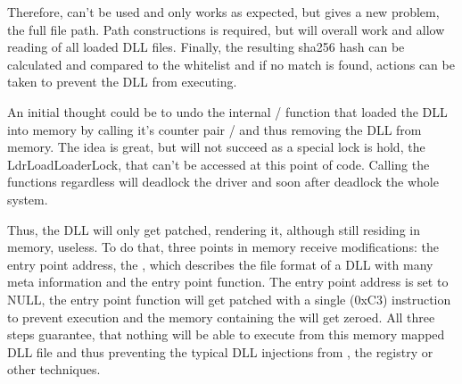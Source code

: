Therefore,  can't be used and only  works as expected, but gives a new problem, the full file path. Path constructions is required, but will overall work and allow reading of all loaded DLL files. Finally, the resulting sha256 hash can be calculated and compared to the whitelist and if no match is found, actions can be taken to prevent the DLL from executing. 

An initial thought could be to undo the internal  /  function that loaded the DLL into memory by calling it's counter pair  /  and thus removing the DLL from memory. The idea is great, but will not succeed as a special lock is hold, the LdrLoadLoaderLock, that can't be accessed at this point of code. Calling the functions regardless will deadlock the driver and soon after deadlock the whole system.

Thus, the DLL will only get patched, rendering it, although still residing in memory, useless. To do that, three points in memory receive modifications: the entry point address, the , which describes the file format of a DLL with many meta information and the entry point function. The entry point address is set to NULL, the entry point function will get patched with a single  (0xC3) instruction to prevent execution and the memory containing the  will get zeroed. All three steps guarantee, that nothing will be able to execute from this memory mapped DLL file and thus preventing the typical DLL injections from , the registry or other techniques.
